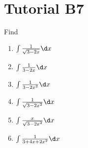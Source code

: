 \section{Tutorial B7}

\begin{problem}
    Find
    \begin{enumerate}
        \item $\int \frac1{\sqrt{3-2x}} \d x$
        \item $\int \frac1{3-2x} \d x$
        \item $\int \frac1{3-2x^2} \d x$
        \item $\int \frac1{\sqrt{3-2x^2}} \d x$
        \item $\int \frac{x}{\sqrt{3-2x^2}} \d x$
        \item $\int \frac1{3+4x+2x^2} \d x$
    \end{enumerate}
\end{problem}
